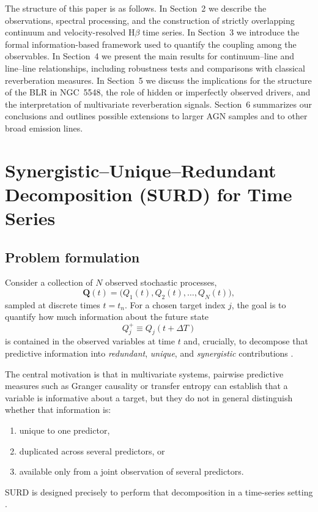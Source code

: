 \documentclass[fleqn,usenatbib]{mnras}
\begin{document}
The structure of this paper is as follows. In Section~2 we describe the observations, spectral processing, and the construction of strictly overlapping continuum and velocity-resolved H$\beta$ time series. In Section~3 we introduce the formal information-based framework used to quantify the coupling among the observables. In Section~4 we present the main results for continuum--line and line--line relationships, including robustness tests and comparisons with classical reverberation measures. In Section~5 we discuss the implications for the structure of the BLR in NGC~5548, the role of hidden or imperfectly observed drivers, and the interpretation of multivariate reverberation signals. Section~6 summarizes our conclusions and outlines possible extensions to larger AGN samples and to other broad emission lines.


\section{Synergistic--Unique--Redundant Decomposition (SURD) for Time Series}
\label{sec:surd_method}

\subsection{Problem formulation}

Consider a collection of \(N\) observed stochastic processes,
\begin{equation}
\mathbf{Q}(t)=\bigl(Q_1(t),Q_2(t),\ldots,Q_N(t)\bigr),
\end{equation}
sampled at discrete times \(t=t_n\). For a chosen target index \(j\), the goal is to quantify how much information about the future state
\begin{equation}
Q_j^+ \equiv Q_j(t+\Delta T)
\end{equation}
is contained in the observed variables at time \(t\) and, crucially, to decompose that predictive information into \emph{redundant}, \emph{unique}, and \emph{synergistic} contributions \cite{MartinezSanchez2024SURD}.

The central motivation is that in multivariate systems, pairwise predictive measures such as Granger causality or transfer entropy can establish that a variable is informative about a target, but they do not in general distinguish whether that information is:
\begin{enumerate}
    \item unique to one predictor,
    \item duplicated across several predictors, or
    \item available only from a joint observation of several predictors.
\end{enumerate}
SURD is designed precisely to perform that decomposition in a time-series setting \cite{MartinezSanchez2024SURD,Schreiber2000,WilliamsBeer2010}.
\end{document}
